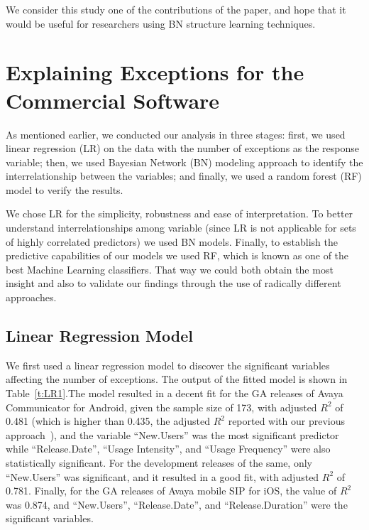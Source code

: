 \documentclass[smallextended]{svjour3}       %
\begin{document}
We consider this study one of the contributions of the paper, and hope that it 
would be useful for researchers using BN structure learning techniques.

\section{Explaining Exceptions for the Commercial Software}\label{s:explain}
As mentioned earlier, we conducted our analysis in three stages: first, we used linear regression (LR) on the data with the number of exceptions as the response variable; then, we used Bayesian Network (BN) modeling approach to identify the interrelationship between the variables; and finally, we used a random forest (RF) model to verify the results. 

We chose LR for the simplicity, robustness and ease of interpretation. To better understand interrelationships among variable (since LR is not applicable for sets of highly correlated predictors) we used BN models. Finally, to establish the 
predictive capabilities of our models we used RF, which is known as one of the best Machine Learning classifiers. That way we could both obtain the most insight and also to validate our findings through the use of radically different approaches.

\vspace{-10pt}
\subsection{Linear Regression Model}
We first used a linear regression model to discover the significant variables affecting the number of exceptions. The  output  of the fitted model is shown in Table~\ref{t:LR1}.The model resulted in a decent fit for the GA releases of Avaya Communicator for Android, given the sample size of 173, with adjusted $R^2$ of 0.481 (which is higher than  0.435, the adjusted $R^2$  reported with our previous approach~\cite{dey2018modeling}), and the variable ``New.Users'' was the most significant predictor while ``Release.Date'', ``Usage Intensity'', and ``Usage Frequency'' were also statistically significant. For the development releases of the same, only ``New.Users'' was significant, and it resulted in a good fit, with adjusted $R^2$ of 0.781.
Finally, for the GA releases of Avaya mobile SIP for iOS, the value of $R^2$ was 0.874, and ``New.Users'', ``Release.Date'', and ``Release.Duration'' were the significant variables.
\end{document}
